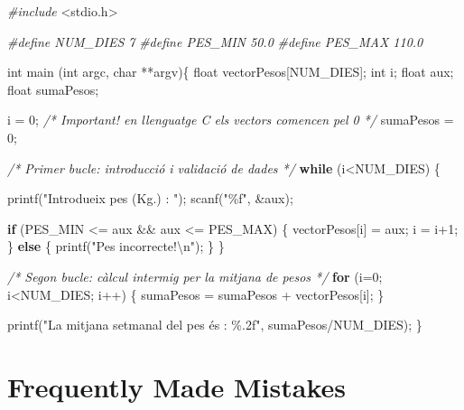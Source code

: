 \documentclass[
]{book}
\newenvironment{Shaded}{\begin{snugshade}}{\end{snugshade}}
\newcommand{\CommentTok}[1]{\textcolor[rgb]{0.56,0.35,0.01}{\textit{#1}}}
\newcommand{\ControlFlowTok}[1]{\textcolor[rgb]{0.13,0.29,0.53}{\textbf{#1}}}
\newcommand{\DataTypeTok}[1]{\textcolor[rgb]{0.13,0.29,0.53}{#1}}
\newcommand{\DecValTok}[1]{\textcolor[rgb]{0.00,0.00,0.81}{#1}}
\newcommand{\ImportTok}[1]{#1}
\newcommand{\NormalTok}[1]{#1}
\newcommand{\PreprocessorTok}[1]{\textcolor[rgb]{0.56,0.35,0.01}{\textit{#1}}}
\newcommand{\SpecialCharTok}[1]{\textcolor[rgb]{0.00,0.00,0.00}{#1}}
\newcommand{\StringTok}[1]{\textcolor[rgb]{0.31,0.60,0.02}{#1}}
\begin{document}
\begin{Shaded}
\begin{Highlighting}[]
\PreprocessorTok{\#include }\ImportTok{\textless{}stdio.h\textgreater{}}

\PreprocessorTok{\#define NUM\_DIES 7}
\PreprocessorTok{\#define PES\_MIN 50.0}
\PreprocessorTok{\#define PES\_MAX 110.0}

\DataTypeTok{int}\NormalTok{ main (}\DataTypeTok{int}\NormalTok{ argc, }\DataTypeTok{char}\NormalTok{ **argv)\{}
    \DataTypeTok{float}\NormalTok{ vectorPesos[NUM\_DIES];}
    \DataTypeTok{int}\NormalTok{ i;}
    \DataTypeTok{float}\NormalTok{ aux;}
    \DataTypeTok{float}\NormalTok{ sumaPesos;}

\NormalTok{    i = }\DecValTok{0}\NormalTok{; }\CommentTok{/* Important! en llenguatge C els vectors comencen pel 0 */}
\NormalTok{    sumaPesos = }\DecValTok{0}\NormalTok{;}

    \CommentTok{/* Primer bucle: introducció i validació de dades */}
    \ControlFlowTok{while}\NormalTok{ (i\textless{}NUM\_DIES) \{}

\NormalTok{        printf(}\StringTok{"Introdueix pes (Kg.) : "}\NormalTok{);}
\NormalTok{        scanf(}\StringTok{"\%f"}\NormalTok{, \&aux);}

        \ControlFlowTok{if}\NormalTok{ (PES\_MIN \textless{}= aux \&\& aux \textless{}= PES\_MAX) \{}
\NormalTok{            vectorPesos[i] = aux;}
\NormalTok{            i = i+}\DecValTok{1}\NormalTok{;}
\NormalTok{        \} }\ControlFlowTok{else}\NormalTok{ \{}
\NormalTok{            printf(}\StringTok{"Pes incorrecte!}\SpecialCharTok{\textbackslash{}n}\StringTok{"}\NormalTok{);}
\NormalTok{        \}}
\NormalTok{    \}}

    \CommentTok{/* Segon bucle: càlcul intermig per la mitjana de pesos */}
    \ControlFlowTok{for}\NormalTok{ (i=}\DecValTok{0}\NormalTok{; i\textless{}NUM\_DIES; i++) \{}
\NormalTok{        sumaPesos = sumaPesos + vectorPesos[i];}
\NormalTok{    \}}

\NormalTok{    printf(}\StringTok{"La mitjana setmanal del pes és : \%.2f"}\NormalTok{, sumaPesos/NUM\_DIES);}
\NormalTok{\}}
\end{Highlighting}
\end{Shaded}

\hypertarget{frequently-made-mistakes-3}{%
\section{Frequently Made Mistakes}\label{frequently-made-mistakes-3}}
\end{document}
